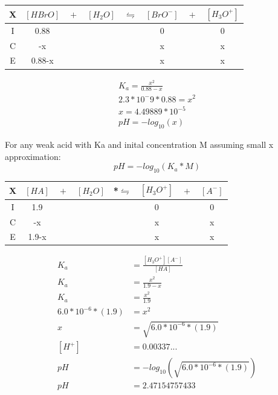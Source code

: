 \documentclass{article}  %
\begin{document}
\begin{tabular}{c|c@{}c@{}c@{}c@{}c@{}c@{}c}
    \hline
    X   & $[HBrO]$ & ${}+{}$ & $[H_2O]$ & ${}\leftrightharpoons{}$ & $[BrO^-]$ & ${}+{}$ & $[H_3O^+]$ \\
    \hline
    I   &  0.88    &&     &&  0   && 0  \\
    C   &   -x   &&     &&  x   &&  x \\
    E   &   0.88-x   &&     &&   x  && x  \\      
\end{tabular}

\begin{equation*}
    \begin{aligned}
        K_a = \frac{x^2}{0.88-x} \\
        2.3*10^-9 * 0.88 = x^2 \\
        x = 4.49889*10^{-5} \\
        pH = -log_{10}(x)     
    \end{aligned}
\end{equation*}

For any weak acid with Ka and inital concentration M assuming small x approximation:
\begin{equation}
    pH = - log_{10}(K_a*M)
\end{equation}

\begin{tabular}{c|c@{}c@{}c@{}c@{}c@{}c@{}c}
    \hline
    X   & $[HA]$ & ${}+{}$ & $[H_2O]$ & *${}\leftrightharpoons{}$ & $[H_3O^+]$ & ${}+{}$ & $[A^-]$ \\
    \hline
    I   &  1.9    &&     &&  0   && 0  \\
    C   &   -x   &&     &&  x   &&  x \\
    E   &   1.9-x   &&     &&   x  && x  \\      
\end{tabular}

\begin{equation*}
    \begin{aligned}
        K_a &= \frac{[H_3O^+][A^-]}{[HA]} \\
        K_a &= \frac{x^2}{1.9-x} \\
        K_a &= \frac{x^2}{1.9} \\
        6.0*10^{-6}*(1.9) &= x^2 \\
        x &= \sqrt{6.0*10^{-6}*(1.9)} \\
        [H^+] &= 0.00337... \\
        pH &= -log_{10}\left(\sqrt{6.0*10^{-6}*(1.9)}\right) \\
        pH &= 2.47154757433
    \end{aligned}
\end{equation*}
\end{document}

